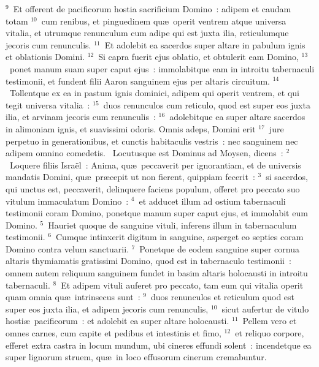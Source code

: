 ${}^{9}$~Et offerent de pacificorum hostia sacrificium Domino~: adipem et caudam totam
${}^{10}$~cum renibus, et pinguedinem qu\ae\ operit ventrem atque universa vitalia, et utrumque renunculum cum adipe qui est juxta ilia, reticulumque jecoris cum renunculis.
${}^{11}$~Et adolebit ea sacerdos super altare in pabulum ignis et oblationis Domini.
${}^{12}$~Si capra fuerit ejus oblatio, et obtulerit eam Domino,
${}^{13}$~ponet manum suam super caput ejus~: immolabitque eam in introitu tabernaculi testimonii, et fundent filii Aaron sanguinem ejus per altaris circuitum.
${}^{14}$~Tollentque ex ea in pastum ignis dominici, adipem qui operit ventrem, et qui tegit universa vitalia~:
${}^{15}$~duos renunculos cum reticulo, quod est super eos juxta ilia, et arvinam jecoris cum renunculis~:
${}^{16}$~adolebitque ea super altare sacerdos in alimoniam ignis, et suavissimi odoris. Omnis adeps, Domini erit
${}^{17}$~jure perpetuo in generationibus, et cunctis habitaculis vestris~: nec sanguinem nec adipem omnino comedetis.
~Locutusque est Dominus ad Moysen, dicens~:
${}^{2}$~Loquere filiis Isra\"el~: Anima, qu\ae\ peccaverit per ignorantiam, et de universis mandatis Domini, qu\ae\ pr\ae cepit ut non fierent, quippiam fecerit~:
${}^{3}$~si sacerdos, qui unctus est, peccaverit, delinquere faciens populum, offeret pro peccato suo vitulum immaculatum Domino~:
${}^{4}$~et adducet illum ad ostium tabernaculi testimonii coram Domino, ponetque manum super caput ejus, et immolabit eum Domino.
${}^{5}$~Hauriet quoque de sanguine vituli, inferens illum in tabernaculum testimonii.
${}^{6}$~Cumque intinxerit digitum in sanguine, asperget eo septies coram Domino contra velum sanctuarii.
${}^{7}$~Ponetque de eodem sanguine super cornua altaris thymiamatis gratissimi Domino, quod est in tabernaculo testimonii~: omnem autem reliquum sanguinem fundet in basim altaris holocausti in introitu tabernaculi.
${}^{8}$~Et adipem vituli auferet pro peccato, tam eum qui vitalia operit quam omnia qu\ae\ intrinsecus sunt~:
${}^{9}$~duos renunculos et reticulum quod est super eos juxta ilia, et adipem jecoris cum renunculis,
${}^{10}$~sicut aufertur de vitulo hosti\ae\ pacificorum~: et adolebit ea super altare holocausti.
${}^{11}$~Pellem vero et omnes carnes, cum capite et pedibus et intestinis et fimo,
${}^{12}$~et reliquo corpore, efferet extra castra in locum mundum, ubi cineres effundi solent~: incendetque ea super lignorum struem, qu\ae\ in loco effusorum cinerum cremabuntur.


